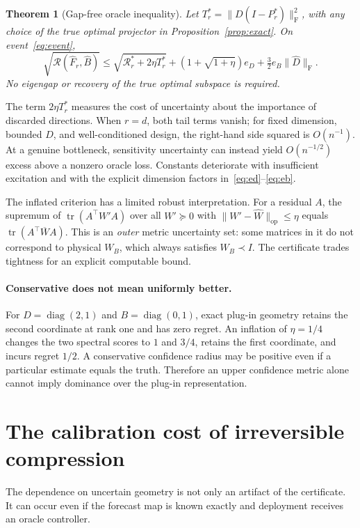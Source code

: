 \documentclass{article}
\newtheorem{theorem}{Theorem}
\newcommand{\tr}{\operatorname{tr}}
\newcommand{\op}{\mathrm{op}}
\newcommand{\Reg}{\mathcal R}
\newcommand{\F}{\mathrm F}
\begin{document}
\begin{theorem}[Gap-free oracle inequality]\label{thm:oracle}
Let $T_r^*=\|D(I-P_r^*)\|_\F^2$, with any choice of the true optimal projector in Proposition~\ref{prop:exact}. On event~\eqref{eq:event},
\begin{equation}\label{eq:oraclebound}
 \sqrt{\Reg(\widehat F_r,\widehat B)}\le
 \sqrt{\Reg_r^*+2\eta T_r^*}
 +(1+\sqrt{1+\eta})e_D+\tfrac32e_B\|\widehat D\|_\F.
\end{equation}
No eigengap or recovery of the true optimal subspace is required.
\end{theorem}
The term $2\eta T_r^*$ measures the cost of uncertainty about the importance of discarded directions. When $r=d$, both tail terms vanish; for fixed dimension, bounded $D$, and well-conditioned design, the right-hand side squared is $O(n^{-1})$. At a genuine bottleneck, sensitivity uncertainty can instead yield $O(n^{-1/2})$ excess above a nonzero oracle loss. Constants deteriorate with insufficient excitation and with the explicit dimension factors in~\eqref{eq:ed}--\eqref{eq:eb}.

The inflated criterion has a limited robust interpretation. For a residual $A$, the supremum of $\tr(A^\top W'A)$ over all $W'\succeq0$ with $\|W'-\widehat W\|_\op\le\eta$ equals $\tr(A^\top\overline W A)$. This is an \emph{outer} metric uncertainty set: some matrices in it do not correspond to physical $W_B$, which always satisfies $W_B\prec I$. The certificate trades tightness for an explicit computable bound.

\paragraph{Conservative does not mean uniformly better.}
For $D=\operatorname{diag}(2,1)$ and $B=\operatorname{diag}(0,1)$, exact plug-in geometry retains the second coordinate at rank one and has zero regret. An inflation of $\eta=1/4$ changes the two spectral scores to $1$ and $3/4$, retains the first coordinate, and incurs regret $1/2$. A conservative confidence radius may be positive even if a particular estimate equals the truth. Therefore an upper confidence metric alone cannot imply dominance over the plug-in representation.

\section{The calibration cost of irreversible compression}
The dependence on uncertain geometry is not only an artifact of the certificate. It can occur even if the forecast map is known exactly and deployment receives an oracle controller.
\end{document}
